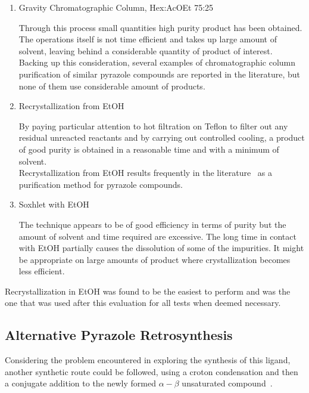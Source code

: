 \documentclass[../Master.tex]{subfiles}
\begin{document}
\begin{enumerate}
	\item  Gravity Chromatographic Column, Hex:AcOEt 75:25

	      Through this process small quantities high purity product has been obtained. The operations itself is not time efficient and takes up large amount of solvent, leaving behind a considerable quantity of product of interest.\\
	      Backing up this consideration, several examples of chromatographic column purification of similar pyrazole compounds are reported in the literature, but none of them use considerable amount of products.
	      \newpage
	\item Recrystallization from EtOH

	      By paying particular attention to hot filtration on Teflon to filter out any residual unreacted reactants and by carrying out controlled cooling, a product of good purity is obtained in a reasonable time and with a minimum of solvent. \\
	      Recrystallization from EtOH results frequently in the literature\ \cite{joshi_synthesis_2004} as a purification method for pyrazole compounds.
	\item Soxhlet with EtOH

	      The technique appears to be of good efficiency in terms of purity but the amount of solvent and time required are excessive. The long time in contact with EtOH partially causes the dissolution of some of the impurities. It might be appropriate on large amounts of product where
	      crystallization becomes less efficient.
\end{enumerate}

Recrystallization in EtOH was found to be the easiest to perform and was the one that was used after this evaluation for all tests when deemed necessary.

\subsection{Alternative Pyrazole Retrosynthesis}\label{sec:alt-pyrazole-synthe}

Considering the problem encountered in exploring the synthesis of this ligand, another synthetic route could be followed, using a croton condensation and then a conjugate addition to the newly formed \(\alpha-\beta\) unsaturated compound\ \cite{cinar_synthesis_2021}.
\end{document}
